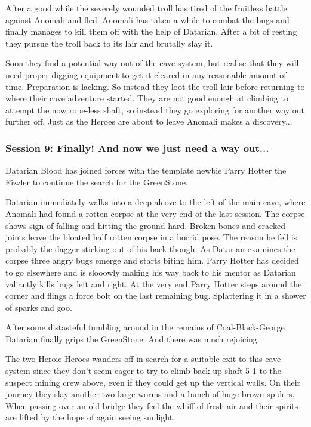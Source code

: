 After a good while the severely wounded troll has tired of the fruitless battle against Anomali and fled. Anomali has taken a while to combat the bugs and finally manages to kill them off with the help of Datarian. After a bit of resting they pursue the troll back to its lair and brutally slay it.

Soon they find a potential way out of the cave system, but realise that they will need proper digging equipment to get it cleared in any reasonable amount of time. Preparation is lacking. So instead they loot the troll lair before returning to where their cave adventure started. They are not good enough at climbing to attempt the now rope-less shaft, so instead they go exploring for another way out further off. Just as the Heroes are about to leave Anomali makes a discovery...


\subsubsection*{Session 9: Finally! And now we just need a way out...}
Datarian Blood has joined forces with the template newbie Parry Hotter the Fizzler to continue the search for the GreenStone.

Datarian immediately walks into a deep alcove to the left of the main cave, where Anomali had found a rotten corpse at the very end of the last session.
The corpse shows sign of falling and hitting the ground hard. Broken bones and cracked joints leave the bloated half rotten corpse in a horrid pose. The reason he fell is probably the dagger sticking out of his back though. As Datarian examines the corpse three angry bugs emerge and starts biting him. Parry Hotter has decided to go elsewhere and is slooowly making his way back to his mentor as Datarian valiantly kills bugs left and right. At the very end Parry Hotter steps around the corner and flings a force bolt on the last remaining bug. Splattering it in a shower of sparks and goo.

After some distasteful fumbling around in the remains of Coal-Black-George Datarian finally grips the GreenStone. And there was much rejoicing.

The two Heroic Heroes wanders off in search for a suitable exit to this cave system since they don't seem eager to try to climb back up shaft 5-1 to the suspect mining crew above, even if they could get up the vertical walls.
On their journey they slay another two large worms and a bunch of huge brown spiders. When passing over an old bridge they feel the whiff of fresh air and their spirits are lifted by the hope of again seeing sunlight.

